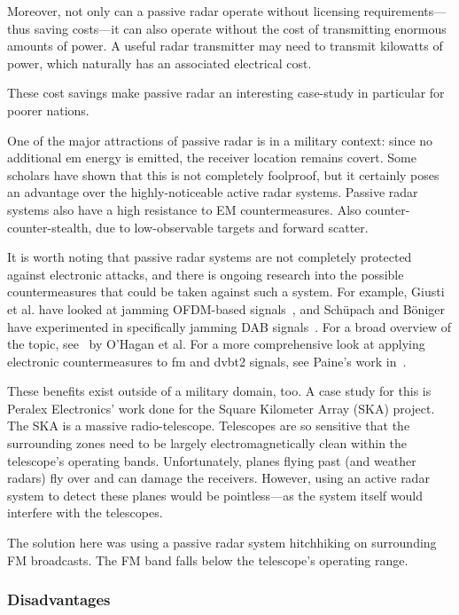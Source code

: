 \documentclass[class=report,11pt,crop=false]{standalone}
\begin{document}
Moreover, not only can a passive radar operate without licensing requirements---thus saving costs---it can also operate without the cost of transmitting enormous amounts of power. A useful radar transmitter may need to transmit kilowatts of power, which naturally has an associated electrical cost.

These cost savings make passive radar an interesting case-study in particular for poorer nations. 

One of the major attractions of passive radar is in a military context: since no additional \gls{em} energy is emitted, the receiver location remains covert. Some scholars have shown that this is not completely foolproof, but it certainly poses an advantage over the highly-noticeable active radar systems. Passive radar systems also have a high resistance to EM countermeasures. Also counter-counter-stealth, due to low-observable targets and forward scatter.

\cite{o2009passive}

It is worth noting that passive radar systems are not completely protected against electronic attacks, and there is ongoing research into the possible countermeasures that could be taken against such a system. For example, Giusti et al. have looked at jamming OFDM-based signals~\cite{Giusti2018}, and Sch\"upach and B\"oniger have experimented in specifically jamming DAB signals~\cite{schupbach2016}. For a broad overview of the topic, see~\cite{OHagan2019} by O'Hagan et al. For a more comprehensive look at applying electronic countermeasures to \gls{fm} and \gls{dvbt2} signals, see Paine's work in~\cite{painePHD2019}.

These benefits exist outside of a military domain, too. A case study for this is Peralex Electronics' work done for the Square Kilometer Array (SKA) project. The SKA is a massive radio-telescope. Telescopes are so sensitive that the surrounding zones need to be largely electromagnetically clean within the telescope's operating bands. Unfortunately, planes flying past (and weather radars) fly over and can damage the receivers. However, using an active radar system to detect these planes would be pointless---as the system itself would interfere with the telescopes.

The solution here was using a passive radar system hitchhiking on surrounding FM broadcasts. The FM band falls below the telescope's operating range.

\subsubsection{Disadvantages}
\end{document}
